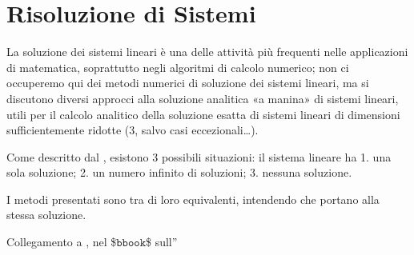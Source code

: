 \documentclass[letterpaper,10pt,italian]{jupyterBook}
\begin{document}
\sphinxAtStartPar
{} 

\sphinxAtStartPar
{} 


\section{Risoluzione di Sistemi}
\label{\detokenize{ch/algebra/linear-algebra:risoluzione-di-sistemi}}\label{\detokenize{ch/algebra/linear-algebra:math-hs-algebra-linear-linear-system-sol}}
\sphinxAtStartPar
La soluzione dei sistemi lineari è una delle attività più frequenti nelle applicazioni di matematica, soprattutto negli algoritmi di calcolo numerico; non ci occuperemo qui dei metodi numerici di soluzione dei sistemi lineari, ma si discutono diversi approcci alla soluzione analitica «a manina» di sistemi lineari, utili per il calcolo analitico della soluzione esatta di sistemi lineari di dimensioni sufficientemente ridotte (3, salvo casi eccezionali…).

\sphinxAtStartPar
Come descritto dal {\hyperref[\detokenize{ch/algebra/linear-algebra:math-hs-algebra-linear-rouche-capelli}]{}}, esistono 3 possibili situazioni: il sistema lineare ha 1. una sola soluzione; 2. un numero infinito di soluzioni; 3. nessuna soluzione.

\sphinxAtStartPar
I metodi presentati sono tra di loro equivalenti, intendendo che portano alla stessa soluzione.  

\sphinxAtStartPar
{} Collegamento a , nel \$\(\texttt{bbook}\)\$ sull”
\end{document}

